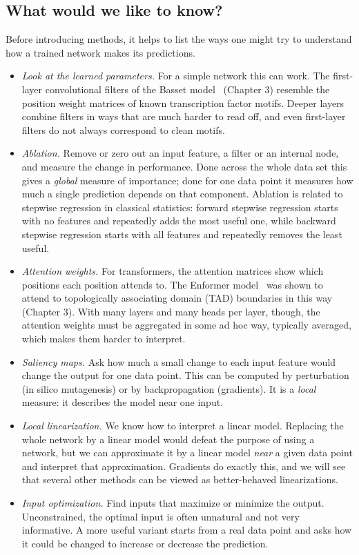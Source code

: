 \subsection{What would we like to know?}

Before introducing methods, it helps to list the ways one might try to understand how a trained network makes its predictions.
\begin{itemize}
  \item \emph{Look at the learned parameters.} For a simple network this can work. The first-layer convolutional filters of the Basset model~\citep{kelley2016} (Chapter 3) resemble the position weight matrices of known transcription factor motifs. Deeper layers combine filters in ways that are much harder to read off, and even first-layer filters do not always correspond to clean motifs.
  \item \emph{Ablation.} Remove or zero out an input feature, a filter or an internal node, and measure the change in performance. Done across the whole data set this gives a \emph{global} measure of importance; done for one data point it measures how much a single prediction depends on that component. Ablation is related to stepwise regression in classical statistics: forward stepwise regression starts with no features and repeatedly adds the most useful one, while backward stepwise regression starts with all features and repeatedly removes the least useful.
  \item \emph{Attention weights.} For transformers, the attention matrices show which positions each position attends to. The Enformer model~\citep{avsec2021} was shown to attend to topologically associating domain (TAD) boundaries in this way (Chapter 3). With many layers and many heads per layer, though, the attention weights must be aggregated in some ad hoc way, typically averaged, which makes them harder to interpret.
  \item \emph{Saliency maps.} Ask how much a small change to each input feature would change the output for one data point. This can be computed by perturbation (in silico mutagenesis) or by backpropagation (gradients). It is a \emph{local} measure: it describes the model near one input.
  \item \emph{Local linearization.} We know how to interpret a linear model. Replacing the whole network by a linear model would defeat the purpose of using a network, but we can approximate it by a linear model \emph{near} a given data point and interpret that approximation. Gradients do exactly this, and we will see that several other methods can be viewed as better-behaved linearizations.
  \item \emph{Input optimization.} Find inputs that maximize or minimize the output. Unconstrained, the optimal input is often unnatural and not very informative. A more useful variant starts from a real data point and asks how it could be changed to increase or decrease the prediction.
\end{itemize}
